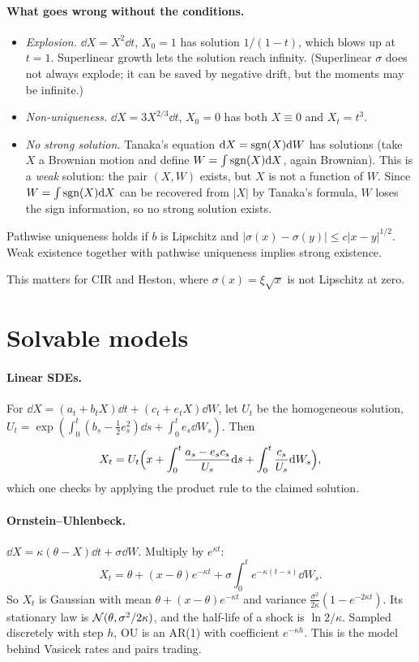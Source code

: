 \paragraph{What goes wrong without the conditions.}
\begin{itemize}
\item \emph{Explosion.} $\dd X=X^2\dd t$, $X_0=1$ has solution $1/(1-t)$, which blows up at $t=1$. Superlinear growth lets the solution reach infinity. (Superlinear $\sigma$ does not always explode; it can be saved by negative drift, but the moments may be infinite.)
\item \emph{Non-uniqueness.} $\dd X=3X^{2/3}\dd t$, $X_0=0$ has both $X\equiv0$ and $X_t=t^3$.
\item \emph{No strong solution.} Tanaka's equation $\mathrm{d} X=\operatorname{sgn}(X)\mathrm{d} W$ has solutions (take $X$ a Brownian motion and define $W=\int\operatorname{sgn}(X)\mathrm{d} X$, again Brownian). This is a \emph{weak} solution: the pair $(X,W)$ exists, but $X$ is not a function of $W$. Since $W=\int\operatorname{sgn}(X)\mathrm{d} X$ can be recovered from $|X|$ by Tanaka's formula, $W$ loses the sign information, so no strong solution exists.
\end{itemize}

\begin{theorem}\label{thm:yw}
Pathwise uniqueness holds if $b$ is Lipschitz and $|\sigma(x)-\sigma(y)|\le c|x-y|^{1/2}$. Weak existence together with pathwise uniqueness implies strong existence.
\end{theorem}

This matters for CIR and Heston, where $\sigma(x)=\xi\sqrt x$ is not Lipschitz at zero.

\section{Solvable models}

\paragraph{Linear SDEs.} For $\dd X=(a_t+b_tX)\dd t+(c_t+e_tX)\dd W$, let $U_t$ be the homogeneous solution, $U_t=\exp(\int_0^t(b_s-\tfrac12e_s^2)\dd s+\int_0^te_s\dd W_s)$. Then
\[
X_t=U_t\Bigl(x+\int_0^t\frac{a_s-e_sc_s}{U_s}\mathrm{d} s+\int_0^t\frac{c_s}{U_s}\mathrm{d} W_s\Bigr),
\]
which one checks by applying the product rule to the claimed solution.

\paragraph{Ornstein--Uhlenbeck.} $\dd X=\kappa(\theta-X)\dd t+\sigma\dd W$. Multiply by $e^{\kappa t}$:
\begin{equation}\label{eq:ou}
X_t=\theta+(x-\theta)e^{-\kappa t}+\sigma\int_0^te^{-\kappa(t-s)}\dd W_s.
\end{equation}
So $X_t$ is Gaussian with mean $\theta+(x-\theta)e^{-\kappa t}$ and variance $\frac{\sigma^2}{2\kappa}(1-e^{-2\kappa t})$. Its stationary law is $\mathcal{N}(\theta,\sigma^2/2\kappa)$, and the half-life of a shock is $\ln2/\kappa$. Sampled discretely with step $h$, OU is an AR(1) with coefficient $e^{-\kappa h}$. This is the model behind Vasicek rates and pairs trading.

